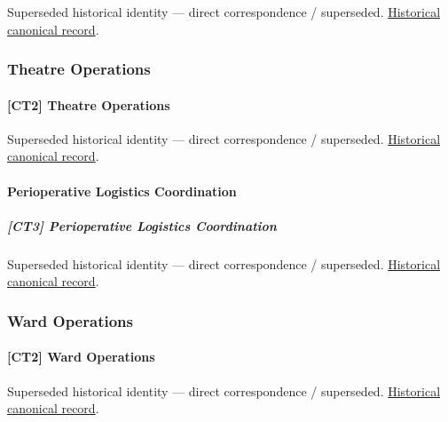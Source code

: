 \par\label{element:8a63b08f34fa42c5bda2a3e12b9ecd55}
Superseded historical identity — direct correspondence / superseded. \href{../../../../continuum/strategy/capability/8a63b08f34fa42c5bda2a3e12b9ecd55.md}{Historical canonical record}.\par

\subsubsection{Theatre Operations}

\paragraph{[CT2] Theatre Operations}

\par\label{element:9ac72fea821c45e2b18632ae9a9867dd}
Superseded historical identity — direct correspondence / superseded. \href{../../../../continuum/strategy/capability/9ac72fea821c45e2b18632ae9a9867dd.md}{Historical canonical record}.\par

\paragraph{Perioperative Logistics Coordination}

\subparagraph{[CT3] Perioperative Logistics Coordination}

\par\label{element:e7813a06b9df462fa135c299261f192e}
Superseded historical identity — direct correspondence / superseded. \href{../../../../continuum/strategy/capability/e7813a06b9df462fa135c299261f192e.md}{Historical canonical record}.\par

\subsubsection{Ward Operations}

\paragraph{[CT2] Ward Operations}

\par\label{element:bf3d2e3581f24beda20a6a3a3348460e}
Superseded historical identity — direct correspondence / superseded. \href{../../../../continuum/strategy/capability/bf3d2e3581f24beda20a6a3a3348460e.md}{Historical canonical record}.\par

